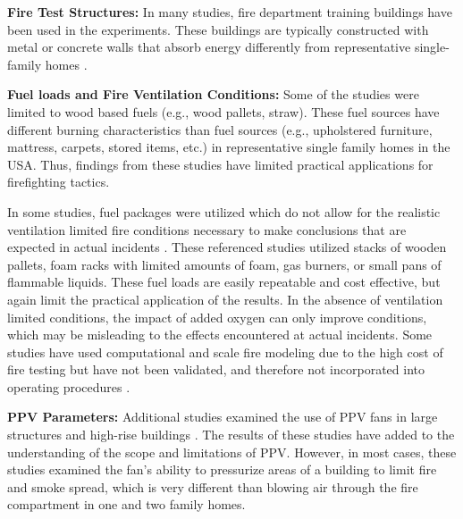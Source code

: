 \documentclass{article}
\begin{document}
\textbf{Fire Test Structures:} In many studies, fire department training buildings have been used in the experiments. These buildings are typically constructed with metal or concrete walls that absorb energy differently from representative single-family homes \cite{HughesPPVTesting} \cite{KerberPPVinTraining} \cite{SvennsonFireVentilationDuringOperatoins}. 

\textbf{Fuel loads and Fire Ventilation Conditions:} Some of the studies were limited to wood based fuels (e.g., wood pallets, straw). These fuel sources have different burning characteristics than fuel sources (e.g., upholstered furniture, mattress, carpets, stored items, etc.) in representative single family homes in the USA. Thus, findings from these studies \cite{HughesPPVTesting} \cite{KerberPPVinTraining} \cite{SvennsonFireVentilationDuringOperatoins} have limited practical applications for firefighting tactics. \par

In some studies, fuel packages were utilized which do not allow for the realistic ventilation limited fire conditions necessary to make conclusions that are expected in actual incidents \cite{ExekoyePPVHouseFires} \cite{SvenssonFireVentinLargeFireHall} \cite{BowserTacticalVent} \cite{EzekoyePPVStrucuresReport}. These referenced studies utilized stacks of wooden pallets, foam racks with limited amounts of foam, gas burners, or small pans of flammable liquids. These fuel loads are easily repeatable and cost effective, but again limit the practical application of the results. In the absence of ventilation limited conditions, the impact of added oxygen can only improve conditions, which may be misleading to the effects encountered at actual incidents. Some studies have used computational and scale fire modeling due to the high cost of fire testing but have not been validated, and therefore not incorporated into operating procedures \cite{Didona1993modeling} \cite{KerberPPVCFD} \cite{KerberPPVFDS} \cite{TuomisaariVentilationInFirefighting}. \par

\textbf{PPV Parameters:} \mbox{}Additional studies examined the use of PPV fans in large structures and high-rise buildings \cite{SymposiumHighRisePPV} \cite{KerberMadrzyPPVInLargeStructures} \cite{KerberMadrzyPPVInHighRise}. The results of these studies have added to the understanding of the scope and limitations of PPV. However, in most cases, these studies examined the fan's ability to pressurize areas of a building to limit fire and smoke spread, which is very different than blowing air through the fire compartment in one and two family homes. 
\end{document}
